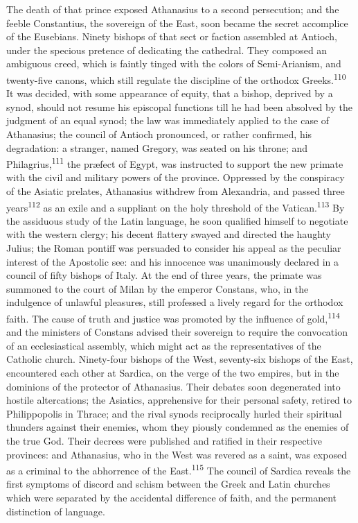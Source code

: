 The death of that prince exposed Athanasius to a second
persecution; and the feeble Constantius, the sovereign of the
East, soon became the secret accomplice of the Eusebians. Ninety
bishops of that sect or faction assembled at Antioch, under the
specious pretence of dedicating the cathedral. They composed an
ambiguous creed, which is faintly tinged with the colors of
Semi-Arianism, and twenty-five canons, which still regulate the
discipline of the orthodox Greeks.\textsuperscript{110} It was decided, with some
appearance of equity, that a bishop, deprived by a synod, should
not resume his episcopal functions till he had been absolved by
the judgment of an equal synod; the law was immediately applied
to the case of Athanasius; the council of Antioch pronounced, or
rather confirmed, his degradation: a stranger, named Gregory, was
seated on his throne; and Philagrius,\textsuperscript{111} the præfect of Egypt,
was instructed to support the new primate with the civil and
military powers of the province. Oppressed by the conspiracy of
the Asiatic prelates, Athanasius withdrew from Alexandria, and
passed three years\textsuperscript{112} as an exile and a suppliant on the holy
threshold of the Vatican.\textsuperscript{113} By the assiduous study of the Latin
language, he soon qualified himself to negotiate with the western
clergy; his decent flattery swayed and directed the haughty
Julius; the Roman pontiff was persuaded to consider his appeal as
the peculiar interest of the Apostolic see: and his innocence was
unanimously declared in a council of fifty bishops of Italy. At
the end of three years, the primate was summoned to the court of
Milan by the emperor Constans, who, in the indulgence of unlawful
pleasures, still professed a lively regard for the orthodox
faith. The cause of truth and justice was promoted by the
influence of gold,\textsuperscript{114} and the ministers of Constans advised
their sovereign to require the convocation of an ecclesiastical
assembly, which might act as the representatives of the Catholic
church. Ninety-four bishops of the West, seventy-six bishops of
the East, encountered each other at Sardica, on the verge of the
two empires, but in the dominions of the protector of Athanasius.
Their debates soon degenerated into hostile altercations; the
Asiatics, apprehensive for their personal safety, retired to
Philippopolis in Thrace; and the rival synods reciprocally hurled
their spiritual thunders against their enemies, whom they piously
condemned as the enemies of the true God. Their decrees were
published and ratified in their respective provinces: and
Athanasius, who in the West was revered as a saint, was exposed
as a criminal to the abhorrence of the East.\textsuperscript{115} The council of
Sardica reveals the first symptoms of discord and schism between
the Greek and Latin churches which were separated by the
accidental difference of faith, and the permanent distinction of
language.

